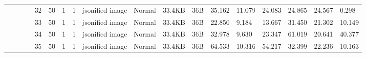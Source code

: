 \begin{landscape}
\begin{table}[]
{\begin{tabular}{@{}ccccllllllllllllll@{}}
                                                                                   &                              &                                &                                                                                                          & 32                                                    & 50                                       & 1                                          & 1                                 & jsonified image                  & Normal                             & 33.4KB                                        & 36B                                             & 35.162                  & 11.079   & 24.083                       & 24.865                  & 24.567   & 0.298                        \\
                                                                                   &                              &                                &                                                                                                          & 33                                                    & 50                                       & 1                                          & 1                                 & jsonified image                  & Normal                             & 33.4KB                                        & 36B                                             & 22.850                  & 9.184    & 13.667                       & 31.450                  & 21.302   & 10.149                       \\
                                                                                   &                              &                                &                                                                                                          & 34                                                    & 50                                       & 1                                          & 1                                 & jsonified image                  & Normal                             & 33.4KB                                        & 36B                                             & 32.978                  & 9.630    & 23.347                       & 61.019                  & 20.641   & 40.377                       \\
                                                                                   &                              &                                &                                                                                                          & 35                                                    & 50                                       & 1                                          & 1                                 & jsonified image                  & Normal                             & 33.4KB                                        & 36B                                             & 64.533                  & 10.316   & 54.217                       & 32.399                  & 22.236   & 10.163                       \\

\end{tabular}}
\end{table}
\end{landscape}
